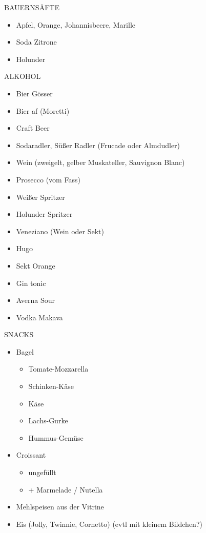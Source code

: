 \documentclass[12pt]{article}
\begin{document}
BAUERNSÄFTE
\begin{itemize}[itemsep=0pt]
    \item[] Apfel, Orange, Johannisbeere, Marille
    \item[] Soda Zitrone
    \item[] Holunder
\end{itemize}
    
ALKOHOL
\begin{itemize}[itemsep=0pt]
    \item[] Bier Gösser
    \item[] Bier af (Moretti)
    \item[] Craft Beer
    \item[] Sodaradler, Süßer Radler \textcolor{Apricot}{(Frucade oder Almdudler)}
    \item[] Wein (zweigelt, gelber Muskateller, Sauvignon Blanc)
    \item[] Prosecco (vom Fass)
    \item[] Weißer Spritzer
    \item[] Holunder Spritzer
    \item[] Veneziano (Wein oder Sekt)
    \item[] Hugo
    \item[] Sekt Orange
    \item[] Gin tonic
    \item[] \textcolor{JungleGreen}{Averna Sour}
    \item[] Vodka Makava
\end{itemize}
    

SNACKS
\begin{itemize}[itemsep=0pt]
    \item[] Bagel
    \begin{itemize}[itemsep=0pt]
        \item[] Tomate-Mozzarella
        \item[] Schinken-Käse
        \item[] Käse
        \item[] Lachs-Gurke
        \item[] \textcolor{JungleGreen}{Hummus-Gemüse}
    \end{itemize}
        
    \item[] Croissant
    \begin{itemize}[itemsep=0pt]
        \item[] ungefüllt
        \item[] + Marmelade / Nutella
    \end{itemize}
        
    \item[] Mehlspeisen aus der Vitrine
    \item[] \textcolor{JungleGreen}{Eis (Jolly, Twinnie, Cornetto) (evtl mit kleinem Bildchen?)}
\end{itemize}
    
\end{document}
